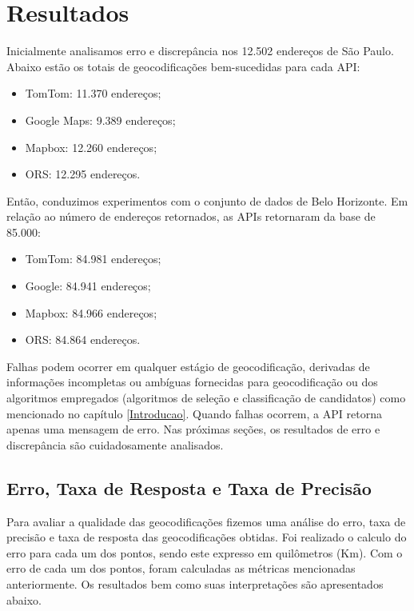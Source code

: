 \chapter{Resultados} \label{resultado}

Inicialmente analisamos erro e discrepância nos 12.502 endereços de São Paulo. Abaixo estão os totais de geocodificações bem-sucedidas para cada API:

\begin{itemize}
    \item TomTom: 11.370 endereços;
    \item Google Maps: 9.389 endereços;
    \item Mapbox: 12.260 endereços;
    \item ORS: 12.295 endereços.
\end{itemize}

Então, conduzimos experimentos com o conjunto de dados de Belo Horizonte. Em relação ao número de endereços retornados, as APIs retornaram da base de 85.000:

\begin{itemize}
    \item TomTom: 84.981 endereços;
    \item Google: 84.941 endereços;
    \item Mapbox: 84.966 endereços; 
    \item ORS: 84.864 endereços.
\end{itemize}    

Falhas podem ocorrer em qualquer estágio de geocodificação, derivadas de informações incompletas ou ambíguas fornecidas para geocodificação ou dos algoritmos empregados (algoritmos de seleção e classificação de candidatos) como mencionado no capítulo \ref{Introducao}. Quando falhas ocorrem, a API retorna apenas uma mensagem de erro. Nas próximas seções, os resultados de erro e discrepância são cuidadosamente analisados.

\section{Erro, Taxa de Resposta e Taxa de Precisão}

Para avaliar a qualidade das geocodificações fizemos uma análise do erro, taxa de precisão e taxa de resposta das geocodificações obtidas. Foi realizado o calculo do erro para cada um dos pontos, sendo este expresso em quilômetros (Km). Com o erro de cada um dos pontos, foram calculadas as métricas mencionadas anteriormente. Os resultados bem como suas interpretações são apresentados abaixo.


